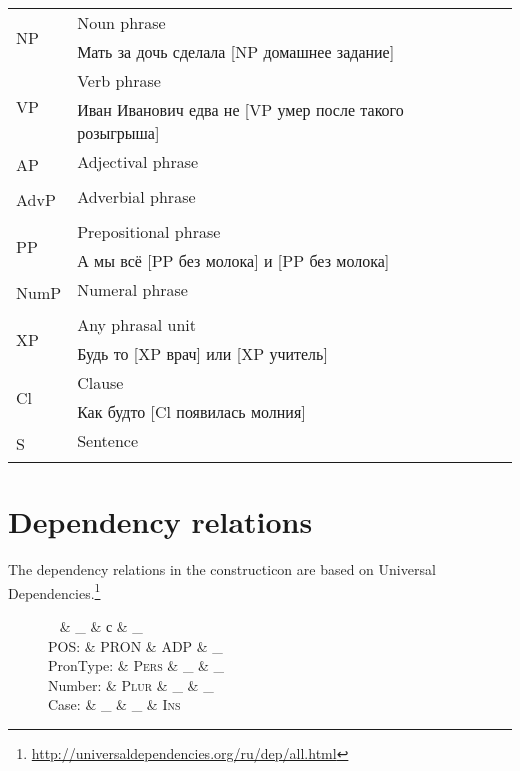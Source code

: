 \documentclass[a4paper,11pt, onecolumn,twoside]{article}
\newcommand{\gmk}[1]{{\rm {\ll \textsc{#1}}}}
\newcommand{\udlabel}[1]{{\udfont #1}}
\begin{document}
\begin{tabular}{lll}

\multirow{2}{*}{NP} & Noun phrase & \\
                    & Мать за дочь сделала [NP домашнее задание] & \\
\multirow{2}{*}{VP} & Verb phrase & \\
                    & Иван Иванович едва не [VP умер после такого розыгрыша] & \\
\multirow{2}{*}{AP} & Adjectival phrase & \\
                    & & \\
\multirow{2}{*}{AdvP} & Adverbial phrase & \\
                    & & \\
\multirow{2}{*}{PP} & Prepositional phrase & \\
                    & А мы всё [PP без молока] и [PP без молока] & \\
\multirow{2}{*}{NumP} & Numeral phrase & \\
                    & & \\
\multirow{2}{*}{XP} & Any phrasal unit & \\
                    & Будь то [XP врач] или [XP учитель] & \\
\multirow{2}{*}{Cl} & Clause & \\
                    & Как будто [Cl появилась молния] & \\
\multirow{2}{*}{S} & Sentence & \\
                    & & \\
\end{tabular}

\section{Dependency relations}

The dependency relations in the constructicon are based on Universal Dependencies.\footnote{\url{http://universaldependencies.org/ru/dep/all.html}}

\begin{figure}
\centering
        \begin{dependency}%
           \begin{deptext}[column sep=0.2cm]
                     ~ \&   \_ \& с \& \_                \\
                     POS:  \&  \gmk{PRON} \& \gmk{ADP} \& \_        \\
                     PronType:  \& \gmk{Pers} \& \_ \& \_ \\
                     Number: \& \gmk{Plur} \& \_ \& \_ \\
                     Case: \& \_ \& \_ \& \gmk{Ins} \\
                \end{deptext}
                \deproot[edge unit distance=1.3ex]{2}{\udlabel{x}}
                \depedge{4}{3}{\udlabel{case}}
                \depedge{2}{4}{\udlabel{nmod}}
        \end{dependency}
\end{figure}
\end{document}
